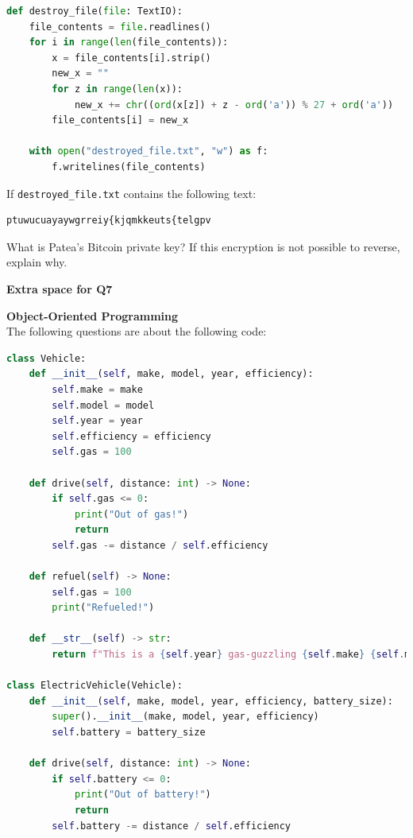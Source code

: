 \documentclass[letterpaper,13pt,addpoints]{exam}
\begin{document}
\begin{questions}
\begin{lstlisting}[language=Python, style=mystyle]
def destroy_file(file: TextIO):
    file_contents = file.readlines()
    for i in range(len(file_contents)):
        x = file_contents[i].strip()
        new_x = ""
        for z in range(len(x)):
            new_x += chr((ord(x[z]) + z - ord('a')) % 27 + ord('a'))
        file_contents[i] = new_x

    with open("destroyed_file.txt", "w") as f:
        f.writelines(file_contents)
    \end{lstlisting}

    If \texttt{destroyed\_file.txt} contains the following text:
    \begin{lstlisting}[language=Python, style=mystyle]
ptuwucuayaywgrreiy{kjqmkkeuts{telgpv
    \end{lstlisting}
    What is Patea's Bitcoin private key? If this encryption is not possible to
    reverse, explain why.

    \clearpage

    \begin{center}
        \textbf{Extra space for Q7}\\
    \end{center}
    \clearpage

    \question[10] \textbf{Object-Oriented Programming} \\
    The following questions are about the following code:
    \begin{lstlisting}[language=Python, style=mystyle]
class Vehicle:
    def __init__(self, make, model, year, efficiency):
        self.make = make
        self.model = model
        self.year = year
        self.efficiency = efficiency
        self.gas = 100
    
    def drive(self, distance: int) -> None:
        if self.gas <= 0:
            print("Out of gas!")
            return
        self.gas -= distance / self.efficiency

    def refuel(self) -> None:
        self.gas = 100
        print("Refueled!")
    
    def __str__(self) -> str:
        return f"This is a {self.year} gas-guzzling {self.make} {self.model} with {self.gas}% gas remaining."

class ElectricVehicle(Vehicle):
    def __init__(self, make, model, year, efficiency, battery_size):
        super().__init__(make, model, year, efficiency)
        self.battery = battery_size
    
    def drive(self, distance: int) -> None:
        if self.battery <= 0:
            print("Out of battery!")
            return
        self.battery -= distance / self.efficiency  
    

\end{lstlisting}
\end{questions}
\end{document}
